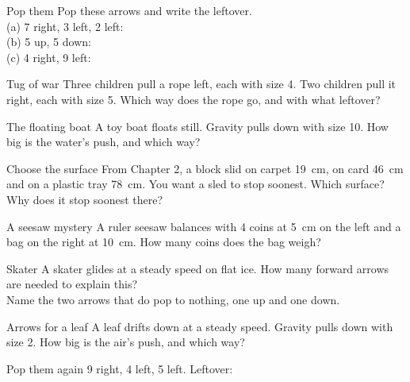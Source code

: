 \begin{puzzle}{Pop them}
Pop these arrows and write the leftover.\\
(a) 7 right, 3 left, 2 left: \wline[2.4cm]\\
(b) 5 up, 5 down: \wline[2.4cm]\\
(c) 4 right, 9 left: \wline[2.4cm]
\end{puzzle}

\begin{puzzle}{Tug of war}
Three children pull a rope left, each with size 4. Two children pull it right, each with size 5. Which way does the rope go, and with what leftover? \wline[4cm]
\end{puzzle}

\begin{puzzle}{The floating boat}
A toy boat floats still. Gravity pulls down with size 10. How big is the water's push, and which way? \wline[3.5cm]
\end{puzzle}

\clearpage

\begin{puzzle}{Choose the surface}
From Chapter 2, a block slid on carpet 19~cm, on card 46~cm and on a plastic tray 78~cm. You want a sled to stop soonest. Which surface? \wline[2.5cm]\\
Why does it stop soonest there? \wline[3cm]
\end{puzzle}

\begin{puzzle}{A seesaw mystery}
A ruler seesaw balances with 4 coins at 5~cm on the left and a bag on the right at 10~cm. How many coins does the bag weigh? \wline[1.8cm]
\end{puzzle}

\begin{puzzle}{Skater}
A skater glides at a steady speed on flat ice. How many forward arrows are needed to explain this? \wline[2cm]\\
Name the two arrows that do pop to nothing, one up and one down. \wline[4cm]
\end{puzzle}

\begin{puzzle}{Arrows for a leaf}
A leaf drifts down at a steady speed. Gravity pulls down with size 2. How big is the air's push, and which way? \wline[3.5cm]
\end{puzzle}

\begin{puzzle}{Pop them again}
9 right, 4 left, 5 left. Leftover: \wline[2.4cm]
\end{puzzle}

